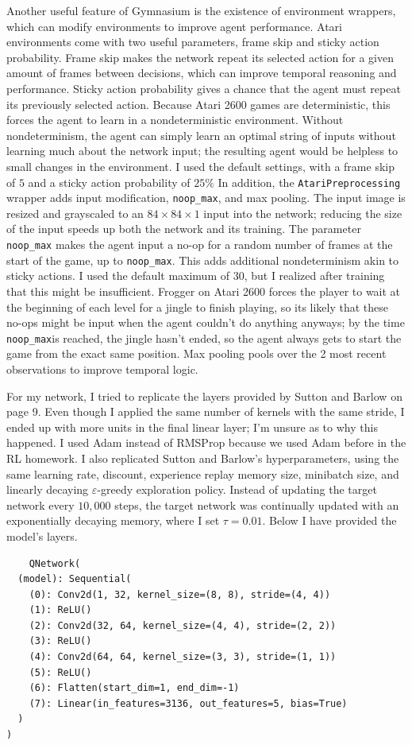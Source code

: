 \documentclass{homework}
\begin{document}
\par Another useful feature of Gymnasium is the existence of environment wrappers, which can modify environments to improve agent performance. Atari environments come with two useful parameters, frame skip and sticky action probability. Frame skip makes the network repeat its selected action for a given amount of frames between decisions, which can improve temporal reasoning and performance. Sticky action probability gives a chance that the agent must repeat its previously selected action. Because Atari 2600 games are deterministic, this forces the agent to learn in a nondeterministic environment. Without nondeterminism, the agent can simply learn an optimal string of inputs without learning much about the network input; the resulting agent would be helpless to small changes in the environment. I used the default settings, with a frame skip of $5$ and a sticky action probability of $25\%$ In addition, the \texttt{AtariPreprocessing} wrapper adds input modification, \texttt{noop_max}, and max pooling. The input image is resized and grayscaled to an $84 \times 84 \times 1$ input into the network; reducing the size of the input speeds up both the network and its training. The parameter \texttt{noop_max} makes the agent input a no-op for a random number of frames at the start of the game, up to \texttt{noop_max}. This adds additional nondeterminism akin to sticky actions. I used the default maximum of $30$, but I realized after training that this might be insufficient. Frogger on Atari 2600 forces the player to wait at the beginning of each level for a jingle to finish playing, so its likely that these no-ops might be input when the agent couldn't do anything anyways; by the time \texttt{noop_max}is reached, the jingle hasn't ended, so the agent always gets to start the game from the exact same position. Max pooling pools over the 2 most recent observations to improve temporal logic. \par
For my network, I tried to replicate the layers provided by Sutton and Barlow on page 9. Even though I applied the same number of kernels with the same stride, I ended up with more units in the final linear layer; I'm unsure as to why this happened. I used Adam instead of RMSProp because we used Adam before in the RL homework. I also replicated Sutton and Barlow's hyperparameters, using the same learning rate, discount, experience replay memory size, minibatch size, and linearly decaying $\varepsilon$-greedy exploration policy. Instead of updating the target network every $10,000$ steps, the target network was continually updated with an exponentially decaying memory, where I set $\tau = 0.01$. Below I have provided the model's layers.
\begin{verbatim}
    QNetwork(
  (model): Sequential(
    (0): Conv2d(1, 32, kernel_size=(8, 8), stride=(4, 4))
    (1): ReLU()
    (2): Conv2d(32, 64, kernel_size=(4, 4), stride=(2, 2))
    (3): ReLU()
    (4): Conv2d(64, 64, kernel_size=(3, 3), stride=(1, 1))
    (5): ReLU()
    (6): Flatten(start_dim=1, end_dim=-1)
    (7): Linear(in_features=3136, out_features=5, bias=True)
  )
)
\end{verbatim}
\end{document}
